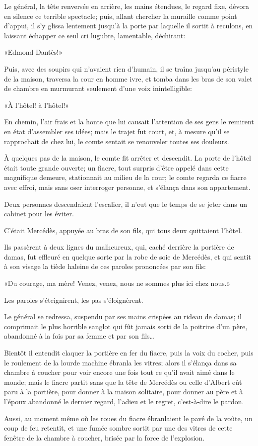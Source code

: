 Le général, la tête renversée en arrière, les mains étendues, le regard fixe, dévora en silence ce terrible spectacle; puis, allant chercher la muraille comme point d'appui, il s'y glissa lentement jusqu'à la porte par laquelle il sortit à reculons, en laissant échapper ce seul cri lugubre, lamentable, déchirant: 

«Edmond Dantès!» 

Puis, avec des soupirs qui n'avaient rien d'humain, il se traîna jusqu'au péristyle de la maison, traversa la cour en homme ivre, et tomba dans les bras de son valet de chambre en murmurant seulement d'une voix inintelligible: 

«À l'hôtel! à l'hôtel!» 

En chemin, l'air frais et la honte que lui causait l'attention de ses gens le remirent en état d'assembler ses idées; mais le trajet fut court, et, à mesure qu'il se rapprochait de chez lui, le comte sentait se renouveler toutes ses douleurs. 

À quelques pas de la maison, le comte fit arrêter et descendit. La porte de l'hôtel était toute grande ouverte; un fiacre, tout surpris d'être appelé dans cette magnifique demeure, stationnait au milieu de la cour; le comte regarda ce fiacre avec effroi, mais sans oser interroger personne, et s'élança dans son appartement. 

Deux personnes descendaient l'escalier, il n'eut que le temps de se jeter dans un cabinet pour les éviter. 

C'était Mercédès, appuyée au bras de son fils, qui tous deux quittaient l'hôtel. 

Ils passèrent à deux lignes du malheureux, qui, caché derrière la portière de damas, fut effleuré en quelque sorte par la robe de soie de Mercédès, et qui sentit à son visage la tiède haleine de ces paroles prononcées par son fils: 

«Du courage, ma mère! Venez, venez, nous ne sommes plus ici chez nous.» 

Les paroles s'éteignirent, les pas s'éloignèrent. 

Le général se redressa, suspendu par ses mains crispées au rideau de damas; il comprimait le plus horrible sanglot qui fût jamais sorti de la poitrine d'un père, abandonné à la fois par sa femme et par son fils\dots 

Bientôt il entendit claquer la portière en fer du fiacre, puis la voix du cocher, puis le roulement de la lourde machine ébranla les vitres; alors il s'élança dans sa chambre à coucher pour voir encore une fois tout ce qu'il avait aimé dans le monde; mais le fiacre partit sans que la tête de Mercédès ou celle d'Albert eût paru à la portière, pour donner à la maison solitaire, pour donner au père et à l'époux abandonné le dernier regard, l'adieu et le regret, c'est-à-dire le pardon. 

Aussi, au moment même où les roues du fiacre ébranlaient le pavé de la voûte, un coup de feu retentit, et une fumée sombre sortit par une des vitres de cette fenêtre de la chambre à coucher, brisée par la force de l'explosion. 
